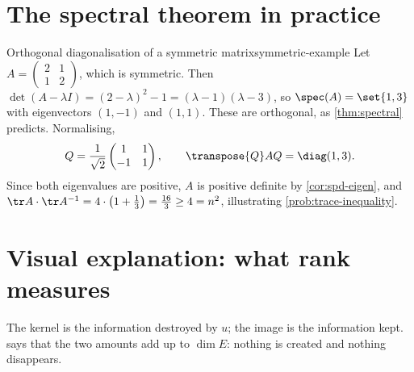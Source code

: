 \section{The spectral theorem in practice}

\begin{example}{Orthogonal diagonalisation of a symmetric matrix}{symmetric-example}
Let $A=\begin{pmatrix}2&1\\1&2\end{pmatrix}$, which is symmetric. Then
$\det(A-\lambda I)=(2-\lambda)^{2}-1=(\lambda-1)(\lambda-3)$, so
$\spec(A)=\set{1,3}$ with eigenvectors $(1,-1)$ and $(1,1)$. These are
orthogonal, as \cref{thm:spectral} predicts. Normalising,
\[
  Q=\frac{1}{\sqrt2}\begin{pmatrix}1&1\\-1&1\end{pmatrix},\qquad
  \transpose{Q}AQ=\diag(1,3).
\]
Since both eigenvalues are positive, $A$ is positive definite by
\cref{cor:spd-eigen}, and
$\tr A\cdot\tr A^{-1}=4\cdot\bigl(1+\tfrac13\bigr)=\tfrac{16}{3}\geq4=n^{2}$,
illustrating \cref{prob:trace-inequality}.
\end{example}

\section{Visual explanation: what rank measures}

\begin{center}
\end{center}

The kernel is the information destroyed by $u$; the image is the information
kept.  says that the two amounts add up to $\dim E$:
nothing is created and nothing disappears.
